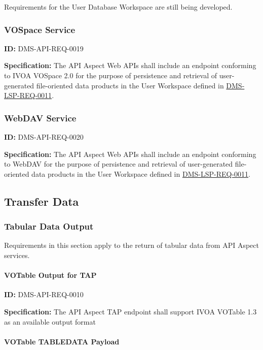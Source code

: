 \documentclass[SE,toc,lsstdraft]{lsstdoc}
\begin{document}
Requirements for the User Database Workspace are still being developed.

\subsubsection{VOSpace Service}

\label{DMS-API-REQ-0019}
\textbf{ID:} DMS-API-REQ-0019

\textbf{Specification:}
The API Aspect Web APIs shall include an endpoint conforming to IVOA VOSpace 2.0 for the purpose of persistence and retrieval of user-generated file-oriented data products in the User Workspace defined in \hyperref[DMS-LSP-REQ-0011]{DMS-LSP-REQ-0011}.

\subsubsection{WebDAV Service}

\label{DMS-API-REQ-0020}
\textbf{ID:} DMS-API-REQ-0020

\textbf{Specification:}
The API Aspect Web APIs shall include an endpoint conforming to WebDAV for the purpose of persistence and retrieval of user-generated file-oriented data products in the User Workspace defined in \hyperref[DMS-LSP-REQ-0011]{DMS-LSP-REQ-0011}.

\subsection{Transfer Data}

\subsubsection{Tabular Data Output}

Requirements in this section apply to the return of tabular data from API Aspect services.

\paragraph{VOTable Output for TAP}\hfill  %

\label{DMS-API-REQ-0010}
\textbf{ID:} DMS-API-REQ-0010

\textbf{Specification:}
The API Aspect TAP endpoint shall support IVOA VOTable 1.3 as an available output format

\paragraph{VOTable TABLEDATA Payload}\hfill  %
\end{document}
